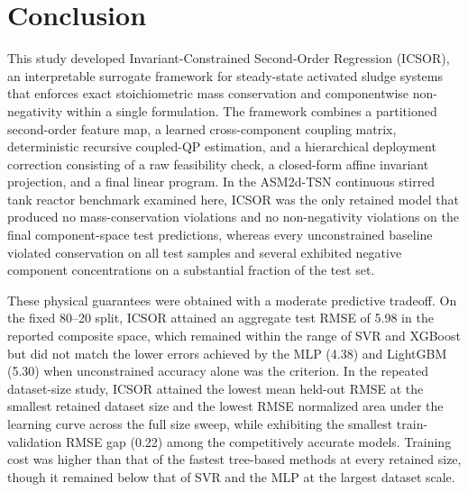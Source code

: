 \documentclass[a4paper,fleqn]{cas-sc}
\newcommand{\rev}[1]{\textcolor{revDefault}{#1}}
\newenvironment{revblock}{\begingroup\color{revDefault}}{\endgroup}
\begin{document}
\section{\rev{Conclusion}}

\begin{revblock}

This study developed Invariant-Constrained Second-Order Regression (ICSOR), an interpretable surrogate framework for steady-state activated sludge systems that enforces exact stoichiometric mass conservation and componentwise non-negativity within a single formulation. The framework combines a partitioned second-order feature map, a learned cross-component coupling matrix, deterministic recursive coupled-QP estimation, and a hierarchical deployment correction consisting of a raw feasibility check, a closed-form affine invariant projection, and a final linear program. In the ASM2d-TSN continuous stirred tank reactor benchmark examined here, ICSOR was the only retained model that produced no mass-conservation violations and no non-negativity violations on the final component-space test predictions, whereas every unconstrained baseline violated conservation on all test samples and several exhibited negative component concentrations on a substantial fraction of the test set.

These physical guarantees were obtained with a moderate predictive tradeoff. On the fixed 80--20 split, ICSOR attained an aggregate test RMSE of 5.98 in the reported composite space, which remained within the range of SVR and XGBoost but did not match the lower errors achieved by the MLP (4.38) and LightGBM (5.30) when unconstrained accuracy alone was the criterion. In the repeated dataset-size study, ICSOR attained the lowest mean held-out RMSE at the smallest retained dataset size and the lowest RMSE normalized area under the learning curve across the full size sweep, while exhibiting the smallest train-validation RMSE gap (0.22) among the competitively accurate models. Training cost was higher than that of the fastest tree-based methods at every retained size, though it remained below that of SVR and the MLP at the largest dataset scale.


\end{revblock}
\end{document}
